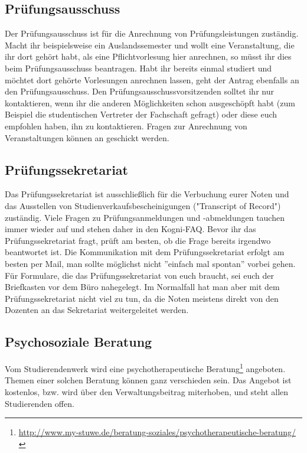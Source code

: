 \subsection*{Prüfungsausschuss} 
Der Prüfungsausschuss ist für die Anrechnung von Prüfungsleistungen zuständig. Macht ihr beispielsweise ein Auslandssemester und wollt eine Veranstaltung, die ihr dort gehört habt, als eine Pflichtvorlesung hier anrechnen, so müsst ihr dies beim Prüfungsausschuss beantragen. Habt ihr bereits einmal studiert und möchtet dort gehörte Vorlesungen anrechnen lassen, geht der Antrag ebenfalls an den Prüfungsausschuss. Den Prüfungsausschussvorsitzenden solltet ihr nur kontaktieren, wenn ihr die anderen Möglichkeiten schon ausgeschöpft habt (zum Beispiel die studentischen Vertreter der Fachschaft gefragt) oder diese euch empfohlen haben, ihn zu kontaktieren. Fragen zur Anrechnung von Veranstaltungen können an  geschickt werden.

\subsection*{Prüfungssekretariat}
Das Prüfungssekretariat ist ausschließlich für die Verbuchung eurer Noten und das Ausstellen von Studienverkaufsbescheinigungen ("Transcript of Record") zuständig. Viele Fragen zu Prüfungsanmeldungen und -abmeldungen tauchen immer wieder auf und stehen daher in den Kogni-FAQ. Bevor ihr das Prüfungssekretariat fragt, prüft am besten, ob die Frage bereits irgendwo beantwortet ist. Die Kommunikation mit dem Prüfungssekretariat erfolgt am besten per Mail, man sollte möglichst nicht ''einfach mal spontan'' vorbei gehen.\\
Für Formulare, die das Prüfungssekretariat von euch braucht, sei euch der Briefkasten vor dem Büro nahegelegt. Im Normalfall hat man aber mit dem Prüfungssekretariat nicht viel zu tun, da die Noten meistens direkt von den Dozenten an das Sekretariat weitergeleitet werden. 

\subsection*{Psychosoziale Beratung}
Vom Studierendenwerk wird eine psychotherapeutische Beratung\footnote{\url{http://www.my-stuwe.de/beratung-soziales/psychotherapeutische-beratung/}} angeboten. Themen einer solchen Beratung können ganz verschieden sein. Das Angebot ist kostenlos, bzw. wird über den Verwaltungsbeitrag miterhoben, und steht allen Studierenden offen.	%

